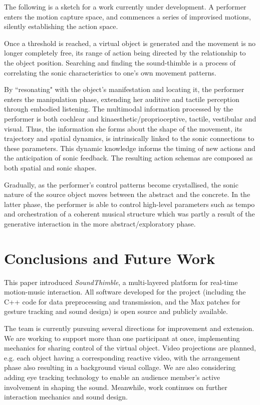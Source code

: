 \documentclass{nime-alternate}
\begin{document}
The following is a sketch for a work currently under development. A performer enters the motion capture space, and commences a series of improvised motions, silently establishing the action space.

Once a threshold is reached, a virtual object is generated and the movement is no longer completely free, its range of action being directed by the relationship to the object position. Searching and finding the sound-thimble is a process of correlating the sonic characteristics to one's own movement patterns.

By ``resonating" with the object's manifestation and locating it, the performer enters the manipulation phase, extending her auditive and tactile perception through embodied listening. The multimodal information processed by the performer is both cochlear and kinaesthetic/proprioceptive, tactile, vestibular and visual. Thus, the information she forms about the shape of the movement, its trajectory and spatial dynamics, is intrinsically linked to the sonic connections to these parameters. This dynamic knowledge informs the timing of new actions and the anticipation of sonic feedback. The resulting action schemas are composed as both spatial and sonic shapes.

Gradually, as the performer's control patterns become crystallised, the sonic nature of the source object moves between the abstract and the concrete. In the latter phase, the performer is able to control high-level parameters such as tempo and orchestration of a coherent musical structure which was partly a result of the generative interaction in the more abstract/exploratory phase.



\section{Conclusions and Future Work}
\label{sec:conc}

This paper introduced \textit{SoundThimble}, a multi-layered platform for real-time motion-music interaction.
All software developed for the project (including the C++ code for data preprocessing and transmission, and the Max patches for gesture tracking and sound design) is open source and publicly available.

The team is currently pursuing several directions for improvement and extension. We are working to support more than one participant at once, implementing mechanics for sharing control of the virtual object. Video projections are planned, e.g. each object having a corresponding reactive video, with the arrangement phase also resulting in a background visual collage. We are also considering adding eye tracking technology to enable an audience member's active involvement in shaping the sound. Meanwhile, work continues on further interaction mechanics and sound design.
\end{document}
